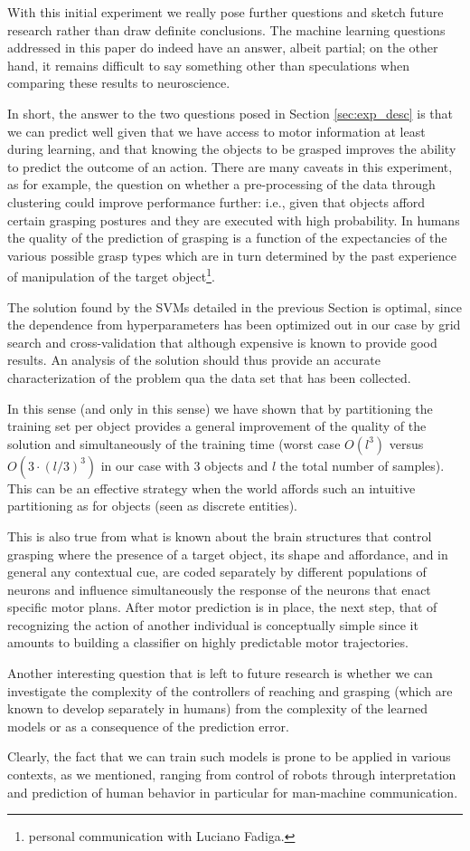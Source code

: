 With this initial experiment we really pose further questions and
sketch future research rather than draw definite conclusions. The
machine learning questions addressed in this paper do indeed have an
answer, albeit partial; on the other hand, it remains difficult to say
something other than speculations when comparing these results to
neuroscience.

In short, the answer to the two questions posed in Section
\ref{sec:exp_desc} is that we can predict well given that we have
access to motor information at least during learning, and that knowing
the objects to be grasped improves the ability to predict the outcome
of an action. There are many caveats in this experiment, as for
example, the question on whether a pre-processing of the data through
clustering could improve performance further: i.e., given that objects
afford certain grasping postures and they are executed with high
probability. In humans the quality of the prediction of grasping is a
function of the expectancies of the various possible grasp types which
are in turn determined by the past experience of manipulation of the
target object\footnote{personal communication with Luciano Fadiga.}.

The solution found by the SVMs detailed in the previous Section is
optimal, since the dependence from hyperparameters has been optimized
out in our case by grid search and cross-validation that although
expensive is known to provide good results. An analysis of the
solution should thus provide an accurate characterization of the
problem qua the data set that has been collected.

In this sense (and only in this sense) we have shown that by
partitioning the training set per object provides a general
improvement of the quality of the solution and simultaneously of the
training time (worst case $O(l^3)$ versus $O(3 \cdot (l/3)^3)$ in our
case with $3$ objects and $l$ the total number of samples). This can
be an effective strategy when the world affords such an intuitive
partitioning as for objects (seen as discrete entities).

This is also true from what is known about the brain structures that
control grasping where the presence of a target object, its shape and
affordance, and in general any contextual cue, are coded separately by
different populations of neurons and influence simultaneously the
response of the neurons that enact specific motor plans. After motor
prediction is in place, the next step, that of recognizing the action
of another individual is conceptually simple since it amounts to
building a classifier on highly predictable motor trajectories.

Another interesting question that is left to future research is
whether we can investigate the complexity of the controllers of
reaching and grasping (which are known to develop separately in
humans) from the complexity of the learned models or as a
consequence of the prediction error.

Clearly, the fact that we can train such models is prone to
be applied in various contexts, as we mentioned, ranging from control
of robots through interpretation and prediction of human behavior in
particular for man-machine communication.
